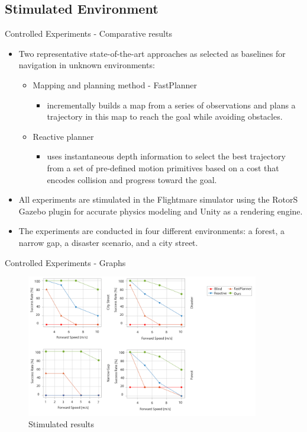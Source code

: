 \documentclass{beamer}
\begin{document}
\subsection{Stimulated Environment}
\begin{frame}{Controlled Experiments - Comparative results}
	\begin{itemize}
		\item Two representative state-of-the-art approaches as selected as baselines for navigation in unknown environments: 
		\begin{itemize}
			\item Mapping and planning method - FastPlanner
			\begin{itemize}
				\item incrementally builds a map from a series of observations and plans a trajectory in this map to reach the
goal while avoiding obstacles.
			\end{itemize}
			\item Reactive planner
			\begin{itemize}
				\item uses instantaneous depth information to select the best trajectory from a set of pre-defined motion primitives
	based on a cost that encodes collision and progress toward the goal.
			\end{itemize}
		\end{itemize}
	
		\item All experiments are stimulated in the Flightmare simulator using the RotorS Gazebo plugin for accurate physics modeling and Unity as a rendering engine.
		
		\item The experiments are conducted in four different environments: a forest, a narrow gap, a disaster scenario, and a city street.
	
	\end{itemize}
\end{frame}

\begin{frame}{Controlled Experiments - Graphs}
	\begin{figure}
		\includegraphics[width=4in]{images/controlled-experiments.png}
		\caption{Stimulated results}
	\end{figure}
	
\end{frame}
\end{document}
